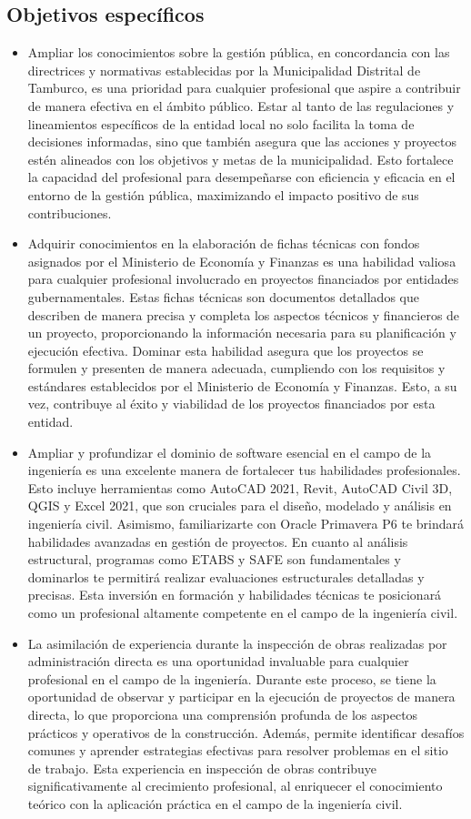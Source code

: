 \subsection{Objetivos específicos}
\begin{itemize}
	\item Ampliar los conocimientos sobre la gestión pública, en concordancia con las directrices y normativas establecidas por la Municipalidad Distrital de Tamburco, es una prioridad para cualquier profesional que aspire a contribuir de manera efectiva en el ámbito público. Estar al tanto de las regulaciones y lineamientos específicos de la entidad local no solo facilita la toma de decisiones informadas, sino que también asegura que las acciones y proyectos estén alineados con los objetivos y metas de la municipalidad. Esto fortalece la capacidad del profesional para desempeñarse con eficiencia y eficacia en el entorno de la gestión pública, maximizando el impacto positivo de sus contribuciones.
	\item Adquirir conocimientos en la elaboración de fichas técnicas con fondos asignados por el Ministerio de Economía y Finanzas es una habilidad valiosa para cualquier profesional involucrado en proyectos financiados por entidades gubernamentales. Estas fichas técnicas son documentos detallados que describen de manera precisa y completa los aspectos técnicos y financieros de un proyecto, proporcionando la información necesaria para su planificación y ejecución efectiva. Dominar esta habilidad asegura que los proyectos se formulen y presenten de manera adecuada, cumpliendo con los requisitos y estándares establecidos por el Ministerio de Economía y Finanzas. Esto, a su vez, contribuye al éxito y viabilidad de los proyectos financiados por esta entidad.
	\item Ampliar y profundizar el dominio de software esencial en el campo de la ingeniería es una excelente manera de fortalecer tus habilidades profesionales. Esto incluye herramientas como AutoCAD 2021, Revit, AutoCAD Civil 3D, QGIS y Excel 2021, que son cruciales para el diseño, modelado y análisis en ingeniería civil. Asimismo, familiarizarte con Oracle Primavera P6 te brindará habilidades avanzadas en gestión de proyectos. En cuanto al análisis estructural, programas como ETABS y SAFE son fundamentales y dominarlos te permitirá realizar evaluaciones estructurales detalladas y precisas. Esta inversión en formación y habilidades técnicas te posicionará como un profesional altamente competente en el campo de la ingeniería civil.
	\item La asimilación de experiencia durante la inspección de obras realizadas por administración directa es una oportunidad invaluable para cualquier profesional en el campo de la ingeniería. Durante este proceso, se tiene la oportunidad de observar y participar en la ejecución de proyectos de manera directa, lo que proporciona una comprensión profunda de los aspectos prácticos y operativos de la construcción. Además, permite identificar desafíos comunes y aprender estrategias efectivas para resolver problemas en el sitio de trabajo. Esta experiencia en inspección de obras contribuye significativamente al crecimiento profesional, al enriquecer el conocimiento teórico con la aplicación práctica en el campo de la ingeniería civil.

\end{itemize}
